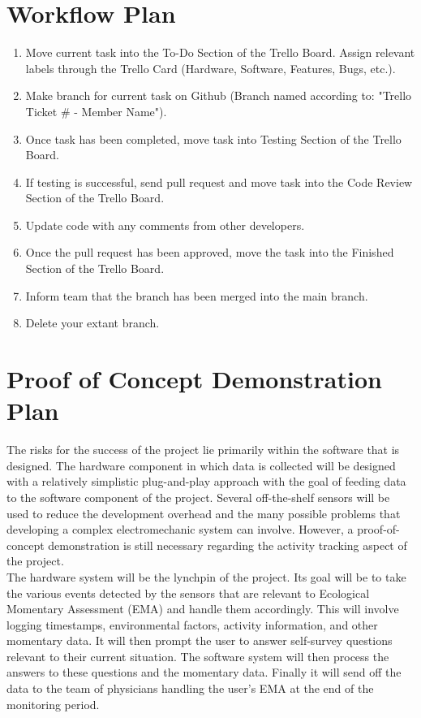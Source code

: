 \documentclass[12pt]{article}
\begin{document}
\section{Workflow Plan}
\begin{enumerate}
\item Move current task into the To-Do Section of the Trello Board. Assign relevant labels through the Trello Card (Hardware, Software, Features, Bugs, etc.).
\item Make branch for current task on Github (Branch named according to: "Trello Ticket \# - Member Name").
\item Once task has been completed, move task into Testing Section of the Trello Board.
\item If testing is successful, send pull request and move task into the Code Review Section of the Trello Board.
\item Update code with any comments from other developers.
\item Once the pull request has been approved, move the task into the Finished Section of the Trello Board.
\item Inform team that the branch has been merged into the main branch.
\item Delete your extant branch.
\end{enumerate}



\section{Proof of Concept Demonstration Plan}

The risks for the success of the project lie primarily within the software that is designed. The hardware component in which data is collected will be designed with a relatively simplistic plug-and-play approach with the goal of feeding data to the software component of the project. Several off-the-shelf sensors will be used to reduce the development overhead and the many possible problems that developing a complex electromechanic system can involve. However, a proof-of-concept demonstration is still necessary regarding the activity tracking aspect of the project.\\

The hardware system will be the lynchpin of the project. Its goal will be to take the various events detected by the sensors that are relevant to Ecological Momentary Assessment (EMA) and handle them accordingly. This will involve logging timestamps, environmental factors, activity information, and other momentary data. It will then prompt the user to answer self-survey questions relevant to their current situation. The software system will then process the answers to these questions and the momentary data. Finally it will send off the data to the team of physicians handling the user's EMA at the end of the monitoring period.\\
\end{document}
